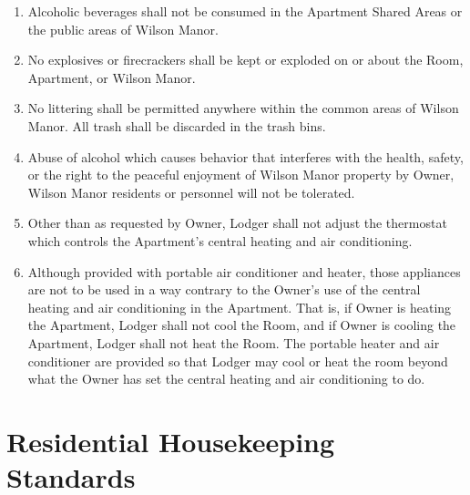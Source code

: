 \documentclass[12pt,letterpaper]{article}
\newcommand{\lodger}{Lodger}
\newcommand{\standards}{Residential Housekeeping Standards}
\newcommand{\condo}{Wilson Manor}
\newcommand{\apt}{Apartment}
\newcommand{\room}{Room}
\newcommand{\shared}{Apartment Shared Areas}
\begin{document}
\begin{enumerate}
	\item Alcoholic beverages shall not be consumed in the \shared{} or the public areas of \condo{}. 
	\item No explosives or firecrackers shall be kept or exploded on or about the \room{}, \apt{}, or \condo{}. 
	\item No littering shall be permitted anywhere within the common areas of \condo{}. All trash shall be discarded in the trash bins. 
	\item Abuse of alcohol which causes behavior that interferes with the health, safety, or the right to the peaceful enjoyment of \condo{} property by Owner, \condo{} residents or personnel will not be tolerated. 
	\item Other than as requested by Owner, \lodger{} shall not adjust the thermostat which controls the \apt{}'s central heating and air conditioning.
	\item Although provided with portable air conditioner and heater, those appliances are not to be used in a way contrary to the Owner's use of the central heating and air conditioning in the \apt{}. That is, if Owner is heating the \apt{}, \lodger{} shall not cool the \room{}, and if Owner is cooling the \apt{}, \lodger{} shall not heat the \room{}. The portable heater and air conditioner are provided so that \lodger{} may cool or heat the room beyond what the Owner has set the central heating and air conditioning to do.
\end{enumerate}


\newpage
\section{\standards{}} \label{standards}
\end{document}

